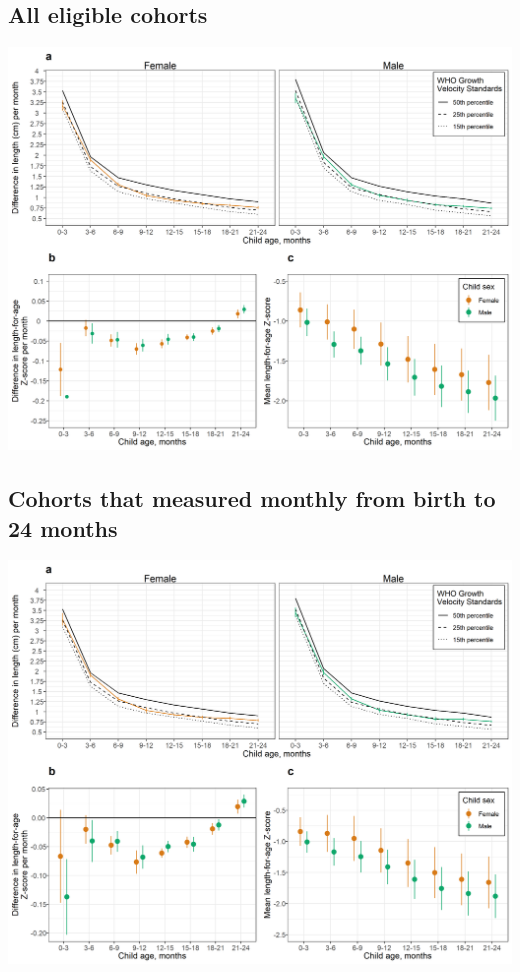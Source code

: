\documentclass[9pt,]{book}
\begin{document}
\hypertarget{all-eligible-cohorts-3}{%
\subsection{All eligible cohorts}\label{all-eligible-cohorts-3}}

\includegraphics[width=41.67in]{figure-copies/fig-stunt-2-vel-overall--allage-primary}

\hypertarget{cohorts-that-measured-monthly-from-birth-to-24-months-3}{%
\subsection{Cohorts that measured monthly from birth to 24 months}\label{cohorts-that-measured-monthly-from-birth-to-24-months-3}}

\includegraphics[width=41.67in]{figure-copies/fig-stunt-2-vel-overall--allage-month24}
\end{document}
